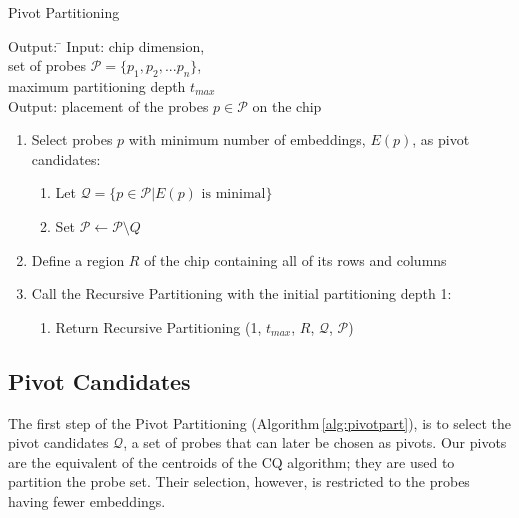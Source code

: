 \documentclass{llncs}
\begin{document}
\begin{algorithm}
\caption{Pivot Partitioning}
\label{alg:pivotpart}
\begin{minipage}{4.8in}

\begin{tabbing}
Output: \=                                  \kill
Input:  \> chip dimension,                          \\
        \> set of probes $\mathcal{P} = \{p_{1}, p_{2}, ... p_{n}\}$,       \\
        \> maximum partitioning depth $t_{max}$                 \\
Output: \> placement of the probes $p \in \mathcal{P}$ on the chip
\end{tabbing}

\begin{enumerate}
\item Select probes $p$ with minimum number of embeddings, $E(p)$,
as pivot candidates:
  \begin{enumerate}
  \item Let $\mathcal{Q} = \{p \in \mathcal{P} | E(p) \mbox{ is minimal}\}$
  \item Set $\mathcal{P} \leftarrow \mathcal{P} \setminus Q$
  \end{enumerate}
\item Define a region $R$ of the chip containing all of its rows and columns
\item Call the Recursive Partitioning with the initial partitioning depth 1:
  \begin{enumerate}
  \item Return Recursive Partitioning (1, $t_{max}$, $R$, $\mathcal{Q}$, $\mathcal{P}$)
  \end{enumerate}
\end{enumerate}

\end{minipage}
\end{algorithm}

\subsection{Pivot Candidates}

The first step of the Pivot Partitioning (Algorithm\,\ref{alg:pivotpart}), is to
select the pivot candidates $\mathcal{Q}$, a set of probes that can later be
chosen as pivots. Our pivots are the equivalent of the centroids of the CQ
algorithm; they are used to partition the probe set. Their
selection, however, is restricted to the probes having fewer embeddings.
\end{document}
